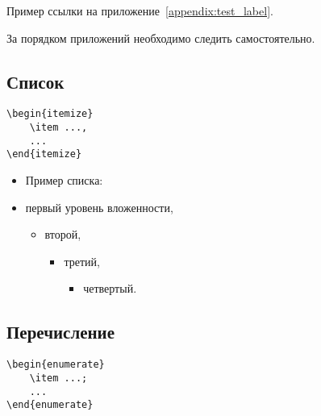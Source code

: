 \documentclass[14pt, a4paper, titlepage]{extarticle}
\begin{document}
Пример ссылки на приложение~\ref{appendix:test_label}.

За порядком приложений необходимо следить самостоятельно.

\subsection{Список}

\begin{verbatim}
\begin{itemize}
    \item ...,
    ...
\end{itemize}
\end{verbatim}

\begin{itemize}
    \item[] Пример списка:
    \item первый уровень вложенности,
    \begin{itemize}
        \item второй,
        \begin{itemize}
            \item третий,
            \begin{itemize}
                \item четвертый.
            \end{itemize}
        \end{itemize}
    \end{itemize}
\end{itemize}

\subsection{Перечисление}

\begin{verbatim}
\begin{enumerate}
    \item ...;
    ...
\end{enumerate} 
\end{verbatim}
\end{document}
